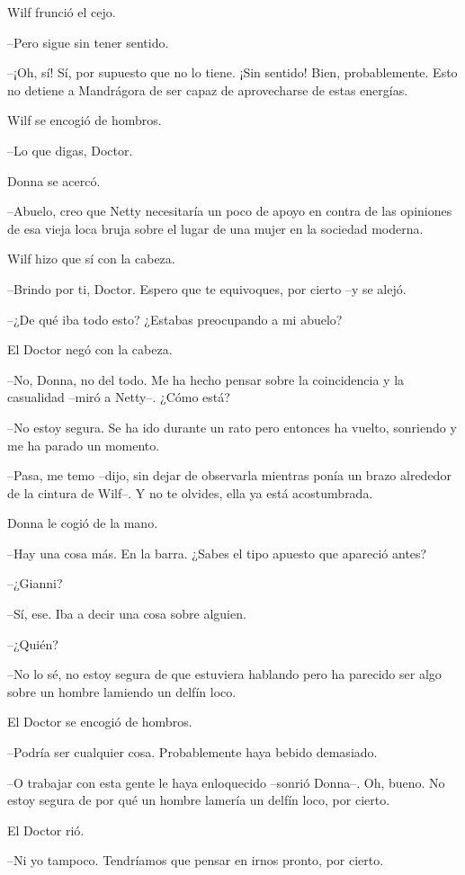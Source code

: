 Wilf frunció el cejo.

--Pero sigue sin tener sentido.

--¡Oh, sí! Sí, por supuesto que no lo tiene. ¡Sin sentido! Bien,
probablemente. Esto no detiene a Mandrágora de ser capaz de aprovecharse
de estas energías.

Wilf se encogió de hombros.

--Lo que digas, Doctor.

Donna se acercó.

--Abuelo, creo que Netty necesitaría un poco de apoyo en contra de las
opiniones de esa vieja loca bruja sobre el lugar de una mujer en la
sociedad moderna.

Wilf hizo que sí con la cabeza.

--Brindo por ti, Doctor. Espero que te equivoques, por cierto  --y se
alejó.

--¿De qué iba todo esto? ¿Estabas preocupando a mi abuelo?

El Doctor negó con la cabeza.

--No, Donna, no del todo. Me ha hecho pensar sobre la coincidencia y la
casualidad --miró a Netty--. ¿Cómo está?

--No estoy segura. Se ha ido durante un rato pero entonces ha vuelto,
sonriendo y me ha parado un momento.

--Pasa, me temo --dijo, sin dejar de observarla mientras ponía un brazo
alrededor de la cintura de Wilf--. Y no te olvides, ella ya está
acostumbrada.

Donna le cogió de la mano.

--Hay una cosa más. En la barra. ¿Sabes el tipo apuesto que apareció
antes?

--¿Gianni?

--Sí, ese. Iba a decir una cosa sobre alguien.

--¿Quién?

--No lo sé, no estoy segura de que estuviera hablando pero ha parecido
ser algo sobre un hombre   lamiendo un delfín loco.

El Doctor se encogió de hombros.

--Podría ser cualquier cosa. Probablemente haya bebido demasiado.

--O trabajar con esta gente le haya enloquecido --sonrió Donna--. Oh,
bueno. No estoy segura de por qué un hombre lamería un delfín loco, por
cierto.

El Doctor rió.

--Ni yo tampoco. Tendríamos que pensar en irnos pronto, por cierto.

